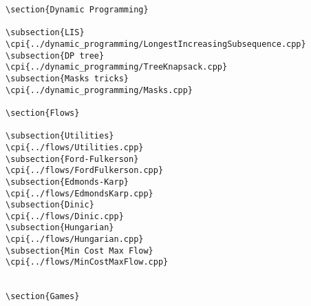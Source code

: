 {\begin{verbatim}
\section{Dynamic Programming}

\subsection{LIS}
\cpi{../dynamic_programming/LongestIncreasingSubsequence.cpp}
\subsection{DP tree}
\cpi{../dynamic_programming/TreeKnapsack.cpp}
\subsection{Masks tricks}
\cpi{../dynamic_programming/Masks.cpp}

\section{Flows}

\subsection{Utilities}
\cpi{../flows/Utilities.cpp}
\subsection{Ford-Fulkerson}
\cpi{../flows/FordFulkerson.cpp}
\subsection{Edmonds-Karp}
\cpi{../flows/EdmondsKarp.cpp}
\subsection{Dinic}
\cpi{../flows/Dinic.cpp}
\subsection{Hungarian}
\cpi{../flows/Hungarian.cpp}
\subsection{Min Cost Max Flow}
\cpi{../flows/MinCostMaxFlow.cpp}


\section{Games}


\end{verbatim}}
